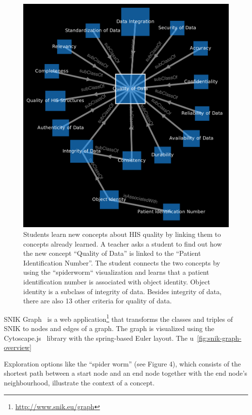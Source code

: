 \documentclass[sw]{iosart2x}
\renewcommand{\citep}{\cite}%
\begin{document}
\begin{figure}
\caption{Students learn new concepts about HIS quality by linking them to concepts already learned.
A teacher asks a student to find out how the new concept \enquote{Quality of Data} is linked to the \enquote{Patient Identification Number}.
The student connects the two concepts by using the “spiderworm“ visualization and learns that a patient identification number is associated with object identity.
Object identity is a subclass of integrity of data.
Besides integrity of data, there are also 13 other criteria for quality of data.}
\label{fig:snik-graph-spiderworm}
\includegraphics[width=\columnwidth]{img/snik-graph-spiderworm.png}
\end{figure}

SNIK Graph~\citep{snikgraph} is a web application\footnote{\url{http://www.snik.eu/graph}} that transforms the classes and triples of SNIK to nodes and edges of a graph.
The graph is visualized using the Cytoscape.js~\citep{cytoscape} library with the spring-based Euler layout.
The u~\cref{fig:snik-graph-overview}

Exploration options like the \enquote{spider worm} (see Figure 4), which consists of the shortest path between a start node and an end node together with the end node’s neighbourhood, illustrate the context of a concept.
\end{document}
